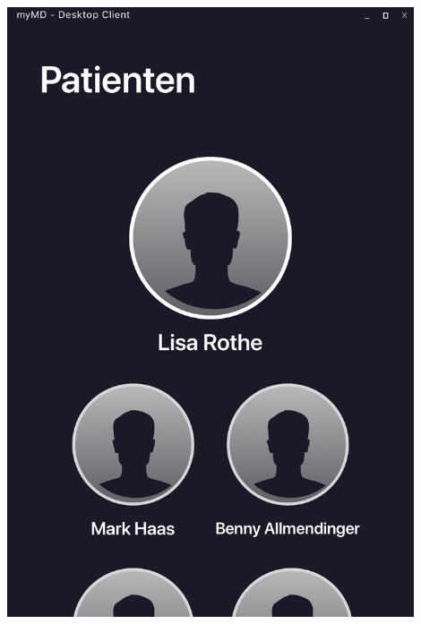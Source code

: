 \documentclass[a4paper]{scrreprt}
\begin{document}
\begin{minipage}[t][][b]{0.45\textwidth}

\includegraphics[width=0.9\textwidth]{mockups/SelectPatient}
~\\

\end{minipage}
\end{document}
